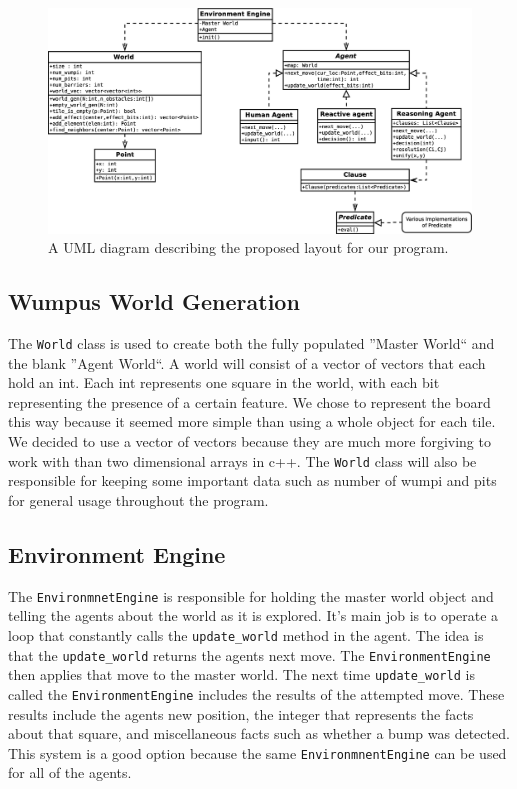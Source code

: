 \documentclass{article}
\begin{document}
	
		   \begin{figure}[h!]
		   	\centering
		   	\includegraphics[width = 1\textwidth]{diagrams/uml_project2}
		   	\caption{A UML diagram describing the proposed layout for our program.}
		   	\label{uml}
		   \end{figure}
		
		\subsection{Wumpus World Generation}
		
			The \texttt{World} class is used to create both the fully populated ''Master World`` and the blank ''Agent World``. 
			A world will consist of a vector of vectors that each hold an int.
			Each int represents one square in the world, with each bit representing the presence of a certain feature. 
			We chose to represent the board this way because it seemed more simple than using a whole object for each tile.
			We decided to use a vector of vectors because they are much more forgiving to work with than two dimensional arrays in c++.
			The \texttt{World} class will also be responsible for keeping some important data such as number of wumpi and pits for general usage throughout the program.
		
		\subsection{Environment Engine}
		The \texttt{EnvironmnetEngine} is responsible for holding the master world object and  telling the agents about the world as it is explored.
		It's main job is to operate a loop that constantly calls the \texttt{update\_world} method in the agent. 
		The idea is that the \texttt{update\_world} returns the agents next move. 
		The \texttt{EnvironmentEngine} then applies that move to the master world.
		The next time \texttt{update\_world} is called the \texttt{EnvironmentEngine} includes the results of the attempted move.
		These results include the agents new position, the integer that represents the facts about that square, and miscellaneous facts such as whether a bump was detected. 
		This system is a good option because the same \texttt{EnvironmnentEngine} can be used for all of the agents. 
\end{document}
